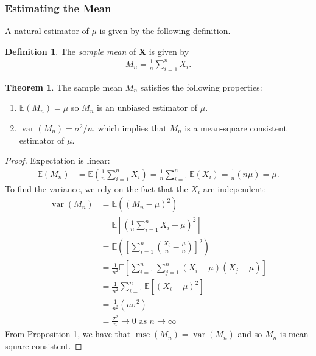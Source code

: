 \documentclass[a4paper,12pt]{article}
\theoremstyle{definition}
\newtheorem{theorem}{Theorem}[section]
\theoremstyle{definition}
\theoremstyle{definition}
\newtheorem{definition}{Definition}[section]
\newcommand{\bs}{\boldsymbol}
\newcommand{\var}{\operatorname{var}}
\newcommand{\mse}{\operatorname{mse}}
\begin{document}
    \subsubsection*{Estimating the Mean}
    A natural estimator of $\mu$ is given by the following definition.
    \begin{definition}
        The \textit{sample mean} of $\bs{X}$ is given by
        \begin{align*}
            M_n = \frac{1}{n} \sum_{i = 1}^n X_i.
        \end{align*}
    \end{definition}
    \begin{theorem}
        The sample mean $M_n$ satisfies the following properties:
        \begin{enumerate}[label=\alph*.]
            \item
                $\mathbb{E}(M_n) = \mu$ so $M_n$ is an unbiased estimator of $\mu$.
            \item
                $\var(M_n) = \sigma^2 / n$, which implies that $M_n$ is a mean-square consistent estimator of $\mu$.
        \end{enumerate}
        \begin{proof}
            Expectation is linear:
            \begin{align*}
                \mathbb{E}(M_n) &= \mathbb{E} \left( \frac{1}{n} \sum_{i = 1}^n X_i \right) = \frac{1}{n} \sum_{i = 1}^n \mathbb{E}(X_i) = \frac{1}{n} (n \mu) = \mu.
            \end{align*}
            To find the variance, we rely on the fact that the $X_i$ are independent:
            \begin{align*}
                \var(M_n) &= \mathbb{E} \left( (M_n - \mu)^2 \right) \\
                &= \mathbb{E} \left[ \left( \frac{1}{n} \sum_{i = 1}^n X_i - \mu \right)^2 \right] \\
                &= \mathbb{E} \left( \left[ \sum_{i = 1}^n \left( \frac{X_i}{n} - \frac{\mu}{n} \right) \right]^2 \right) \\
                &= \frac{1}{n^2} \mathbb{E} \left[ \sum_{i = 1}^n \sum_{j = 1}^n (X_i - \mu)(X_j - \mu) \right] \\
                &= \frac{1}{n^2} \sum_{i = 1}^n \mathbb{E} \left[ (X_i - \mu)^2 \right] \\
                &= \frac{1}{n^2} (n \sigma^2) \\
                &= \frac{\sigma^2}{n} \to 0 \text{ as } n \to \infty
            \end{align*}
            From Proposition 1, we have that $\mse(M_n) = \var(M_n)$ and so $M_n$ is mean-square consistent.
        \end{proof}
    \end{theorem}
\end{document}
